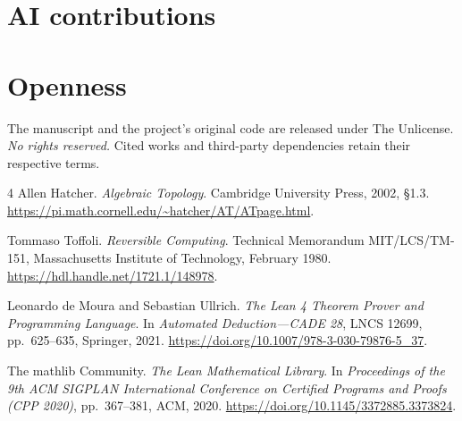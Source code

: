 \documentclass[11pt]{article}
\begin{document}
\section*{AI contributions}
\begingroup\small

\endgroup

\section*{Openness}
The manuscript and the project's original code are released under The
Unlicense. \emph{No rights reserved.} Cited works and third-party dependencies
retain their respective terms.

\begin{thebibliography}{4}\small
{}
Allen Hatcher. \emph{Algebraic Topology}. Cambridge University Press, 2002,
\S1.3. \url{https://pi.math.cornell.edu/~hatcher/AT/ATpage.html}.

Tommaso Toffoli. \emph{Reversible Computing}. Technical Memorandum
MIT/LCS/TM-151, Massachusetts Institute of Technology, February 1980.
\url{https://hdl.handle.net/1721.1/148978}.

Leonardo de Moura and Sebastian Ullrich.
\emph{The Lean 4 Theorem Prover and Programming Language}.
In \emph{Automated Deduction---CADE 28}, LNCS 12699, pp.~625--635,
Springer, 2021. \url{https://doi.org/10.1007/978-3-030-79876-5_37}.

The mathlib Community. \emph{The Lean Mathematical Library}.
In \emph{Proceedings of the 9th ACM SIGPLAN International Conference on
Certified Programs and Proofs (CPP 2020)}, pp.~367--381, ACM, 2020.
\url{https://doi.org/10.1145/3372885.3373824}.
\end{thebibliography}
\end{document}
